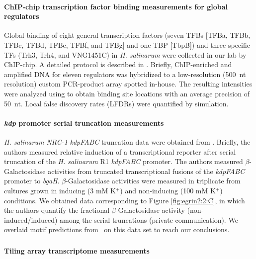 \paragraph{ChIP-chip transcription factor binding measurements for global regulators}

Global binding of eight general transcription factors (seven TFBs [TFBa, TFBb, TFBc, TFBd, TFBe, TFBf, and TFBg] and one TBP [TbpB]) and three specific TFs (Trh3, Trh4, and VNG1451C) in {\it H. salinarum} were collected in our lab by ChIP-chip. A detailed protocol is described in \cite{facciotti_general_2007}. Briefly, ChIP-enriched and amplified DNA for eleven regulators was hybridized to a low-resolution (500~nt resolution) custom PCR-product array spotted in-house. The resulting intensities were analyzed using {} \cite{reiss_model-based_2008} to obtain binding site locations with an average precision of 50~nt. Local false discovery rates (LFDRs) were quantified by simulation.

\paragraph{\textit{kdp} promoter serial truncation measurements}

{\it H. salinarum NRC-1} \textit{kdpFABC} truncation data were obtained from \cite{kixmller_archaeal_2011}. Briefly, the authors measured relative induction of a transcriptional reporter after serial truncation of the \textit{H. salinarum} R1 \textit{kdpFABC} promoter. The authors measured $\beta$-Galactosidase activities from truncated transcriptional fusions of the \textit{kdpFABC} promoter to \textit{bgaH}. $\beta$-Galactosidase activities were measured in triplicate from cultures grown in inducing (3 mM K$^{+}$) and non-inducing (100 mM K$^{+}$) conditions. We obtained data corresponding to Figure \ref{fig:egrin2:2:C}, in which the authors quantify the fractional $\beta$-Galactosidase activity (non-induced/induced) among the serial truncations (private communication). We overlaid motif predictions from \egrine~on this data set to reach our conclusions.

\subsubsection{\eco} \label{ecodata}

\paragraph{Tiling array transcriptome measurements}
\label{section:ecoarray}

